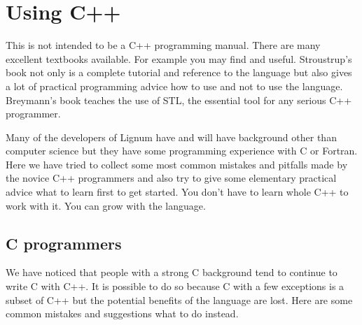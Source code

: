 \section{Using C++}

This is not  intended to be a C++ programming  manual.  There are many
excellent textbooks available.  For  example you may find \cite{Str97}
and  \cite{Brey98} useful. Stroustrup's  book not  only is  a complete
tutorial  and  reference to  the  language but  also  gives  a lot  of
practical  programming  advice   how  to  use  and  not   to  use  the
language. Breymann's book teaches the  use of STL, the essential tool
for any serious C++ programmer.

Many of the  developers of Lignum have and  will have background other
than computer science but they have some programming experience with C
or Fortran.  Here  we have tried to collect  some most common mistakes
and pitfalls made  by the novice C++ programmers and  also try to give
some elementary practical  advice what to learn first  to get started.
You don't have to  learn whole C++ to work with it.  You can grow with
the language.

\subsection{C programmers}

We  have  noticed that  people  with a  strong  C  background tend  to
continue to write C with C++. It is possible to do so because C with a
few exceptions  is a subset of  C++ but the potential  benefits of the
language are lost.  Here are some common mistakes and suggestions what
to do instead.

